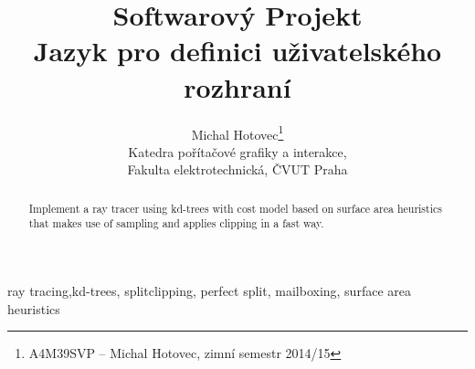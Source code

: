 \documentclass[report,11pt]{elsarticle}
\begin{document}
\begin{frontmatter}

\title{Softwarový Projekt\\ Jazyk pro definici uživatelského rozhraní}

\author{Michal Hotovec\footnote{A4M39SVP -- Michal Hotovec, zimní semestr 2014/15}\\
Katedra pořítačové grafiky a interakce,\\ Fakulta elektrotechnická, ČVUT Praha
}

\date{}


\begin{abstract}
  Implement a ray tracer using kd-trees with cost model based on surface area heuristics that makes use of sampling and applies clipping in a fast way.
\end{abstract}

\begin{keyword}
ray tracing,kd-trees, splitclipping, perfect split, mailboxing, surface area heuristics
\end{keyword}

\end{frontmatter}



\end{document}
